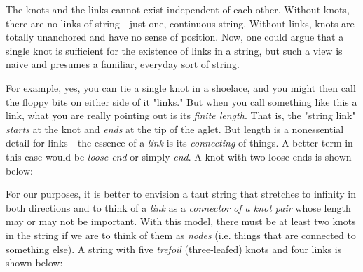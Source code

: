 The knots and the links cannot exist independent of each other. Without knots, there are no links of string---just one, continuous string. Without links, knots are totally unanchored and have no sense of position. Now, one could argue that a single knot is sufficient for the existence of links in a string, but such a view is naive and presumes a familiar, everyday sort of string.

For example, yes, you can tie a single knot in a shoelace, and you might then call the floppy bits on either side of it "links." But when you call something like this a link, what you are really pointing out is its \textit{finite length}. That is, the "string link" \textit{starts} at the knot and \textit{ends} at the tip of the aglet. But length is a nonessential detail for links---the essence of a \textit{link} is its \textit{connecting} of things. A better term in this case would be \textit{loose end} or simply \textit{end}. A knot with two loose ends is shown below:

\vspace{4mm}
\begin{center}  
\end{center}
\vspace{1mm}

For our purposes, it is better to envision a taut string that stretches to infinity in both directions and to think of a \textit{link} as a \textit{connector of a knot pair} whose length may or may not be important. With this model, there must be at least two knots in the string if we are to think of them as \textit{nodes} (i.e. things that are connected to something else). A string with five \textit{trefoil} (three-leafed) knots and four links is shown below:

